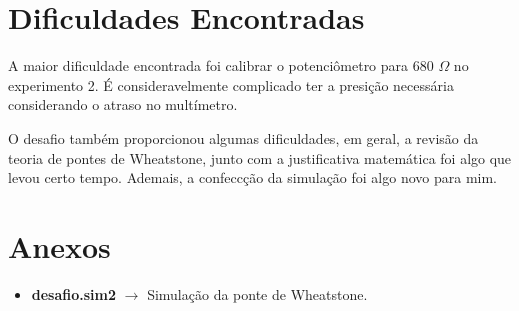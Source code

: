 \documentclass[a4paper,oneside,10pt]{article}
\begin{document}
\section{Dificuldades Encontradas}

A maior dificuldade encontrada foi calibrar o potenciômetro para 680 $\Omega$ no experimento 2. É consideravelmente complicado ter a presição necessária considerando o atraso no multímetro.

O desafio também proporcionou algumas dificuldades, em geral, a revisão da teoria de pontes de Wheatstone, junto com a justificativa matemática foi algo que levou certo tempo. Ademais, a confeccção da simulação foi algo novo para mim.

\section{Anexos}


\begin{itemize}
    \item \textbf{desafio.sim2} $\rightarrow$ Simulação da ponte de Wheatstone.
\end{itemize}
\end{document}
